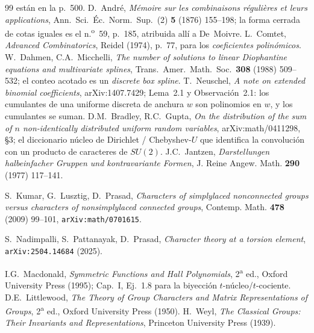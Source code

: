 \documentclass[11pt,a4paper]{article}
\begin{document}
\begin{thebibliography}{99}
est\'an en la p.~500.
 D.~Andr\'e, \emph{M\'emoire sur les combinaisons r\'eguli\`eres et leurs
applications}, Ann.\ Sci.\ \'Ec.\ Norm.\ Sup.\ (2) \textbf{5} (1876) 155--198; la forma cerrada
de cotas iguales es el n.\textsuperscript{o}~59, p.~185, atribuida all\'i a De~Moivre.
 L.~Comtet, \emph{Advanced Combinatorics}, Reidel (1974), p.~77, para los
\emph{coeficientes polin\'omicos}.
 W.~Dahmen, C.A.~Micchelli, \emph{The number of solutions to linear
Diophantine equations and multivariate splines}, Trans.\ Amer.\ Math.\ Soc.\ \textbf{308}
(1988) 509--532; el conteo acotado es un \emph{discrete box spline}.
 T.~Neuschel, \emph{A note on extended binomial coefficients},
arXiv:1407.7429; Lema~2.1 y Observaci\'on~2.1: los cumulantes de una uniforme discreta de
anchura $w$ son polinomios en $w$, y los cumulantes se suman.
 D.M.~Bradley, R.C.~Gupta, \emph{On the distribution of the sum of $n$
non-identically distributed uniform random variables}, arXiv:math/0411298, \S3; el diccionario
n\'ucleo de Dirichlet / Chebyshev-$U$ que identifica la convoluci\'on con un producto de
caracteres de $SU(2)$.
 J.C.~Jantzen, \emph{Darstellungen halbeinfacher Gruppen und kontravariante
Formen}, J. Reine Angew. Math. \textbf{290} (1977) 117--141.

 S.~Kumar, G.~Lusztig, D.~Prasad, \emph{Characters of simplylaced nonconnected groups
versus characters of nonsimplylaced connected groups}, Contemp. Math. \textbf{478} (2009) 99--101,
\texttt{arXiv:math/0701615}.

 S.~Nadimpalli, S.~Pattanayak, D.~Prasad, \emph{Character theory at a torsion
element}, \texttt{arXiv:2504.14684} (2025).

 I.G.~Macdonald, \emph{Symmetric Functions and Hall Polynomials}, 2\textsuperscript{a} ed.,
Oxford University Press (1995); Cap.~I, Ej.~1.8 para la biyecci\'on $t$-n\'ucleo/$t$-cociente.
 D.E.~Littlewood, \emph{The Theory of Group Characters and Matrix
Representations of Groups}, 2\textsuperscript{a} ed., Oxford University Press (1950).
 H.~Weyl, \emph{The Classical Groups: Their Invariants and Representations},
Princeton University Press (1939).
\end{thebibliography}
\end{document}
